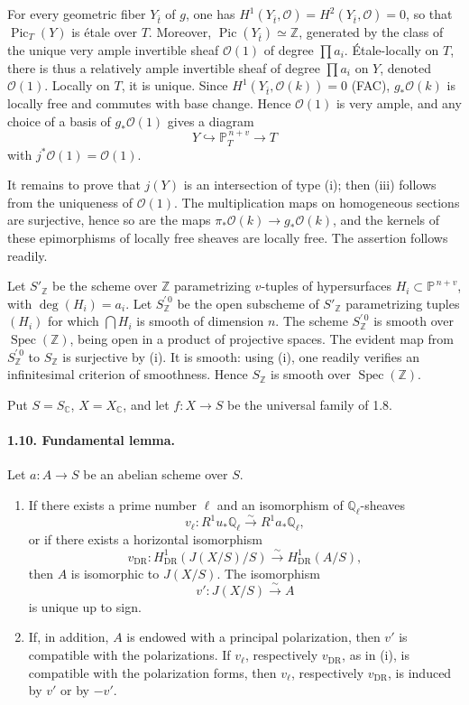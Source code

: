 \documentclass[10pt]{article}
\newcommand{\C}{\mathbb C}
\newcommand{\Pj}{\mathbb P}
\newcommand{\Q}{\mathbb Q}
\newcommand{\Z}{\mathbb Z}
\newcommand{\DR}{\mathrm{DR}}
\newcommand{\Spec}{\operatorname{Spec}}
\newcommand{\Pic}{\operatorname{Pic}}
\newcommand{\iso}{\xrightarrow{\sim}}
\begin{document}
For every geometric fiber \(Y_{\bar t}\) of \(g\), one has \(H^1(Y_{\bar t},\mathcal O)=H^2(Y_{\bar t},\mathcal O)=0\), so that \(\Pic_T(Y)\) is étale over \(T\). Moreover, \(\Pic(Y_{\bar t})\simeq\Z\), generated by the class of the unique very ample invertible sheaf \(\mathcal O(1)\) of degree \(\prod a_i\). Étale-locally on \(T\), there is thus a relatively ample invertible sheaf of degree \(\prod a_i\) on \(Y\), denoted \(\mathcal O(1)\). Locally on \(T\), it is unique. Since \(H^1(Y_{\bar t},\mathcal O(k))=0\) (FAC), \(g_*\mathcal O(k)\) is locally free and commutes with base change. Hence \(\mathcal O(1)\) is very ample, and any choice of a basis of \(g_*\mathcal O(1)\) gives a diagram
\[
Y\hookrightarrow \Pj^{\,n+v}_T\longrightarrow T
\]
with \(j^*\mathcal O(1)=\mathcal O(1)\).

It remains to prove that \(j(Y)\) is an intersection of type (i); then (iii) follows from the uniqueness of \(\mathcal O(1)\). The multiplication maps on homogeneous sections are surjective, hence so are the maps \(\pi_*\mathcal O(k)\to g_*\mathcal O(k)\), and the kernels of these epimorphisms of locally free sheaves are locally free. The assertion follows readily.

Let \(S'_\Z\) be the scheme over \(\Z\) parametrizing \(v\)-tuples of hypersurfaces \(H_i\subset\Pj^{\,n+v}\), with \(\deg(H_i)=a_i\). Let \(S_\Z^{\prime\,0}\) be the open subscheme of \(S'_\Z\) parametrizing tuples \((H_i)\) for which \(\bigcap H_i\) is smooth of dimension \(n\). The scheme \(S_\Z^{\prime\,0}\) is smooth over \(\Spec(\Z)\), being open in a product of projective spaces. The evident map from \(S_\Z^{\prime\,0}\) to \(S_\Z\) is surjective by (i). It is smooth: using (i), one readily verifies an infinitesimal criterion of smoothness. Hence \(S_\Z\) is smooth over \(\Spec(\Z)\).

Put \(S=S_\C\), \(X=X_\C\), and let \(f:X\to S\) be the universal family of 1.8.

\paragraph{1.10. Fundamental lemma.} Let \(a:A\to S\) be an abelian scheme over \(S\).
\begin{enumerate}[label=(\roman*)]
\item If there exists a prime number \(\ell\) and an isomorphism of \(\Q_\ell\)-sheaves
\[
v_\ell:R^1u_*\Q_\ell\iso R^1a_*\Q_\ell,
\]
or if there exists a horizontal isomorphism
\[
v_{\DR}:H^1_{\DR}(J(X/S)/S)\iso H^1_{\DR}(A/S),
\]
then \(A\) is isomorphic to \(J(X/S)\). The isomorphism
\[
v':J(X/S)\iso A
\]
is unique up to sign.
\item If, in addition, \(A\) is endowed with a principal polarization, then \(v'\) is compatible with the polarizations. If \(v_\ell\), respectively \(v_{\DR}\), as in (i), is compatible with the polarization forms, then \(v_\ell\), respectively \(v_{\DR}\), is induced by \(v'\) or by \(-v'\).
\end{enumerate}
\end{document}
